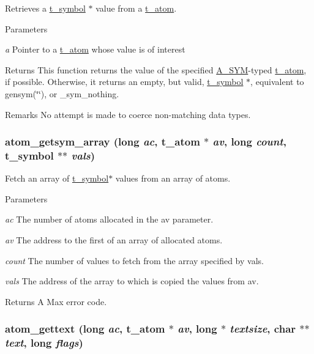 Retrieves a \hyperlink{structt__symbol}{t\_\-symbol} $\ast$ value from a \hyperlink{structt__atom}{t\_\-atom}. 
\begin{DoxyParams}{Parameters}
\item[{\em a}]Pointer to a \hyperlink{structt__atom}{t\_\-atom} whose value is of interest \end{DoxyParams}
\begin{DoxyReturn}{Returns}
This function returns the value of the specified \hyperlink{group__atom_gga8aa6700e9f00b132eb376db6e39ade47a2d661c2a5d949566e2f1944c99bceeea}{A\_\-SYM}-\/typed \hyperlink{structt__atom}{t\_\-atom}, if possible. Otherwise, it returns an empty, but valid, \hyperlink{structt__symbol}{t\_\-symbol} $\ast$, equivalent to {\ttfamily gensym(\char`\"{}\char`\"{})}, or {\ttfamily \_\-sym\_\-nothing}.
\end{DoxyReturn}
\begin{DoxyRemark}{Remarks}
No attempt is made to coerce non-\/matching data types. 
\end{DoxyRemark}
\hypertarget{group__atom_ga48c3655238debe58e8a943dc28381953}{
\subsubsection[{atom\_\-getsym\_\-array}]{ atom\_\-getsym\_\-array (long {\em ac}, \/  {\bf t\_\-atom} $\ast$ {\em av}, \/  long {\em count}, \/  {\bf t\_\-symbol} $\ast$$\ast$ {\em vals})}}
\label{group__atom_ga48c3655238debe58e8a943dc28381953}


Fetch an array of \hyperlink{structt__symbol}{t\_\-symbol}$\ast$ values from an array of atoms. 
\begin{DoxyParams}{Parameters}
\item[{\em ac}]The number of atoms allocated in the av parameter. \item[{\em av}]The address to the first of an array of allocated atoms. \item[{\em count}]The number of values to fetch from the array specified by vals. \item[{\em vals}]The address of the array to which is copied the values from av. \end{DoxyParams}
\begin{DoxyReturn}{Returns}
A Max error code. 
\end{DoxyReturn}
\hypertarget{group__atom_gade94ebf977b43b151a906b2b70d12301}{
\subsubsection[{atom\_\-gettext}]{ atom\_\-gettext (long {\em ac}, \/  {\bf t\_\-atom} $\ast$ {\em av}, \/  long $\ast$ {\em textsize}, \/  char $\ast$$\ast$ {\em text}, \/  long {\em flags})}}
\label{group__atom_gade94ebf977b43b151a906b2b70d12301}


